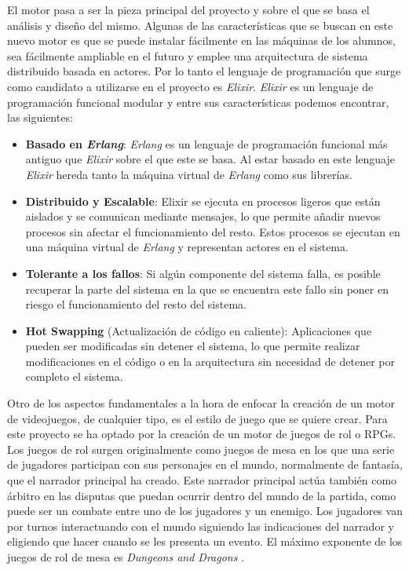 El motor pasa a ser la pieza principal del proyecto y sobre el que se basa el análisis y diseño del mismo. Algunas de las características que se buscan en este nuevo motor es que se puede instalar fácilmente en las máquinas de los alumnos, sea fácilmente ampliable en el futuro y emplee una arquitectura de sistema distribuido basada en actores. Por lo tanto el lenguaje de programación que surge como candidato a utilizarse en el proyecto es \textit{Elixir}. \textit{Elixir} \cite{elixir} es un lenguaje de programación funcional modular y entre sus características podemos encontrar, las siguientes:
\begin{itemize}
	\item \textbf{Basado en \textit{Erlang}}: \textit{Erlang} es un lenguaje de programación funcional más antiguo que \textit{Elixir} sobre el que este se basa. Al estar basado en este lenguaje \textit{Elixir} hereda tanto la máquina virtual de \textit{Erlang} como sus librerías.
	\item \textbf{Distribuido y Escalable}: Elixir se ejecuta en procesos ligeros que están aislados y se comunican mediante mensajes, lo que permite añadir nuevos procesos sin afectar el funcionamiento del resto. Estos procesos se ejecutan en una máquina virtual de \textit{Erlang} y representan actores en el sistema.
	\item \textbf{Tolerante a los fallos}: Si algún componente del sistema falla, es posible recuperar la parte del sistema en la que se encuentra este fallo sin poner en riesgo el funcionamiento del resto del sistema.
	\item \textbf{\textbf{Hot Swapping}} (Actualización de código en caliente): Aplicaciones que pueden ser modificadas sin detener el sistema, lo que permite realizar modificaciones en el código o en la arquitectura sin necesidad de detener por completo el sistema.
\end{itemize}

Otro de los aspectos fundamentales a la hora de enfocar la creación de un motor de videojuegos, de cualquier tipo, es el estilo de juego que se quiere crear. Para este proyecto se ha optado por la creación de un motor de juegos de rol o RPGs. 
\\

Los juegos de rol surgen originalmente como juegos de mesa en los que una serie de jugadores participan con sus personajes en el mundo, normalmente de fantasía, que el narrador principal ha creado. Este narrador principal actúa también como árbitro en las disputas que puedan ocurrir dentro del mundo de la partida, como puede ser un combate entre uno de los jugadores y un enemigo. Los jugadores van por turnos interactuando con el mundo siguiendo las indicaciones del narrador y eligiendo que hacer cuando se les presenta un evento. El máximo exponente de los juegos de rol de mesa es \textit{Dungeons and Dragons} \cite{dungeons_and_dragons}.
\\


